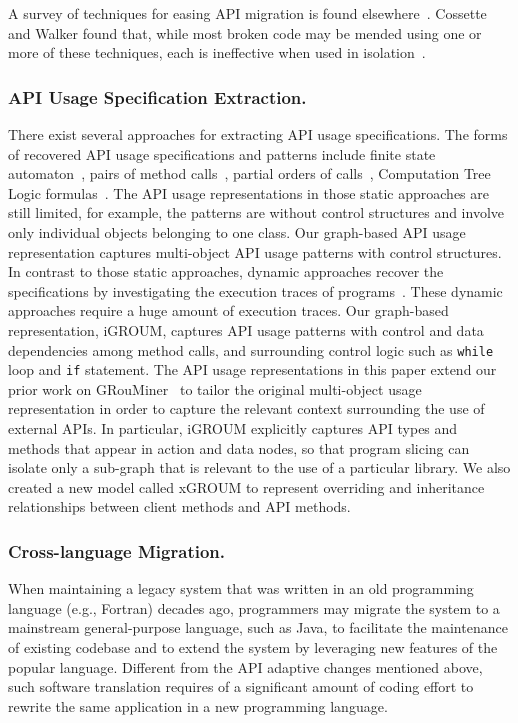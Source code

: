 \documentclass[runningheads,a4paper]{llncs}
\newcommand{\codefont}[1]{\footnotesize{\texttt{#1}}\normalsize}
\begin{document}
A survey of techniques for easing API migration is found elsewhere~\cite{cossette2012}. Cossette and Walker found that, while most broken code may be mended using one or more of these techniques, each is ineffective when used in isolation~\cite{cossette2012}.  

\subsubsection{API Usage Specification Extraction.} 
There exist several approaches for extracting API usage specifications. The forms of recovered API usage specifications and patterns include finite state automaton~\cite{zeller07,doc2spec}, pairs of method calls~\cite{Livshits2005,williams-tse05}, partial orders of calls~\cite{mapo-fse07,taoxie-ase09}, Computation Tree Logic formulas~\cite{zeller-ase09}. The API usage representations in those static approaches are still limited, for example, the patterns are without control structures and involve only individual objects belonging to one class. Our graph-based API usage representation captures multi-object API usage patterns with control structures. In contrast to those static approaches, dynamic approaches recover the specifications by investigating the execution traces of programs~\cite{javert,perracotta,shoham-issta07,ramanathan-isce07,mike-ase09}.  These dynamic approaches require a huge amount of execution traces.  Our graph-based representation, iGROUM, captures API usage patterns with control and data dependencies among method calls, and surrounding control logic such as \codefont{while} loop and \codefont{if} statement. 
The API usage representations in this paper extend our prior work on GRouMiner~\cite{Nguyen09} to tailor the original multi-object usage representation in order to capture the relevant context surrounding the use of external APIs. In particular, iGROUM explicitly captures API types and methods that appear in action and data nodes, so that program slicing can isolate only a sub-graph that is relevant to the use of a particular library. We also created a new model called xGROUM to represent overriding and inheritance relationships between client methods and API methods. 


\subsubsection{Cross-language Migration.} 
When maintaining a legacy system that was written in an old programming language (e.g., Fortran) decades ago, programmers may migrate the system to a mainstream general-purpose language, such as Java, to facilitate the maintenance of existing codebase and to extend the system by leveraging new features of the popular language. Different from the API adaptive changes mentioned above, such software translation requires of a significant amount of coding effort to rewrite the same application in a new programming language.
\end{document}
